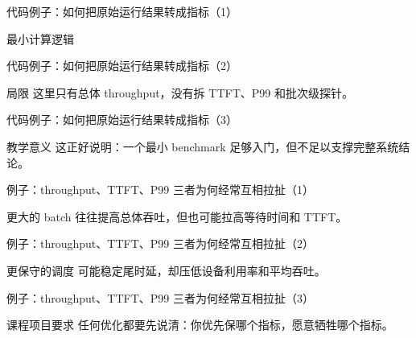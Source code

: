 \begin{frame}{代码例子：如何把原始运行结果转成指标（1）}
\begin{block}{最小计算逻辑}
    {\ttfamily\small
    \par
    \par
    \par
    }
  \end{block}
\end{frame}

\begin{frame}{代码例子：如何把原始运行结果转成指标（2）}
\begin{block}{局限}
    这里只有总体 throughput，没有拆 TTFT、P99 和批次级探针。
  \end{block}
\end{frame}

\begin{frame}{代码例子：如何把原始运行结果转成指标（3）}
\begin{block}{教学意义}
    这正好说明：一个最小 benchmark 足够入门，但不足以支撑完整系统结论。
  \end{block}
\end{frame}

\begin{frame}{例子：throughput、TTFT、P99 三者为何经常互相拉扯（1）}
\begin{block}{更大的 batch}
    往往提高总体吞吐，但也可能拉高等待时间和 TTFT。
  \end{block}
\end{frame}

\begin{frame}{例子：throughput、TTFT、P99 三者为何经常互相拉扯（2）}
\begin{block}{更保守的调度}
    可能稳定尾时延，却压低设备利用率和平均吞吐。
  \end{block}
\end{frame}

\begin{frame}{例子：throughput、TTFT、P99 三者为何经常互相拉扯（3）}
\begin{block}{课程项目要求}
    任何优化都要先说清：你优先保哪个指标，愿意牺牲哪个指标。
  \end{block}
\end{frame}

